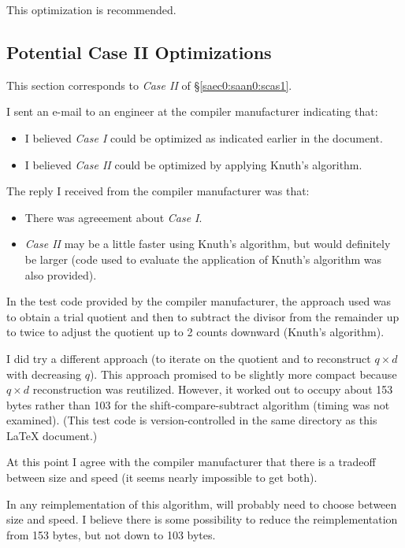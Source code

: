 \documentclass[letterpaper,10pt,titlepage]{article}
\begin{document}
This optimization is recommended.



\subsection{Potential Case II Optimizations}
\label{spop0:scas1}

This section corresponds to \emph{Case II} of \S{}\ref{saec0:saan0:scas1}.

I sent an e-mail to an engineer at the compiler manufacturer indicating
that:

\begin{itemize}
\item I believed \emph{Case I} could be optimized as indicated earlier
      in the document.
\item I believed \emph{Case II} could be optimized by applying Knuth's
      algorithm.      
\end{itemize}

The reply I received from the compiler manufacturer was that:

\begin{itemize}
\item There was agreeement about \emph{Case I}.
\item \emph{Case II} may be a little faster using Knuth's algorithm, but would
      definitely be larger (code used to evaluate the application of Knuth's
      algorithm was also provided).
\end{itemize}

In the test code provided by the compiler manufacturer, the approach used was 
to obtain a trial quotient and then to subtract the divisor from the remainder
up to twice to adjust the quotient up to 2 counts downward (Knuth's algorithm).

I did try a different approach (to iterate on the quotient and to reconstruct
$q \times d$ with decreasing $q$).  This approach promised to be slightly more
compact because $q \times d$ reconstruction was reutilized.  However, it worked out
to occupy about 153 bytes rather than 103 for the shift-compare-subtract
algorithm (timing was not examined).  (This test code is version-controlled
in the same directory as this \LaTeX{} document.)

At this point I agree with the
compiler manufacturer 
that there is a tradeoff between size and speed (it seems
nearly impossible to get both).

In any reimplementation of this algorithm, will probably need to choose between
size and speed.  I believe there is some possibility to reduce the reimplementation
from 153 bytes, but not down to 103 bytes.

\end{document}
